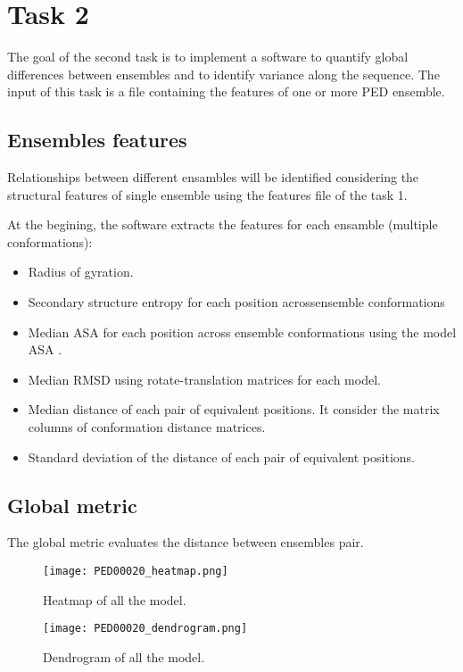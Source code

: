 \section{Task 2}\label{sec:task2}

The goal of the second task is to implement a software to quantify global differences between ensembles and to identify variance along the sequence. The input of this task is a file containing the features of one or more PED ensemble.

\subsection{Ensembles features}
Relationships between different ensambles will be identified considering the structural features of single ensemble using the features file of the task 1.

At the begining, the software extracts the features for each ensamble (multiple conformations):
\begin{itemize}
\item Radius of gyration.
\item Secondary structure entropy for each position acrossensemble conformations
\item Median ASA for each position across ensemble conformations using the model ASA .
\item Median RMSD using rotate-translation matrices for each model.
\item Median distance of each pair of equivalent positions. It consider the matrix columns of conformation distance matrices.
\item Standard deviation of the distance of each pair of equivalent positions.
\end{itemize}


\subsection{Global metric}
The global metric evaluates the distance between ensembles pair. 

\begin{figure}[H]
	\begin{minipage}[b]{0.9\textwidth}
		\centering
		\texttt{[image: PED00020\_heatmap.png]}
		\caption{Heatmap of all the model.}
		\label{heatmap}
	\end{minipage}
	\hfill
	\begin{minipage}[b]{0.9\textwidth}
		\centering
		\texttt{[image: PED00020\_dendrogram.png]}
		\caption{Dendrogram of all the model.}
		\label{dendrogram}
	\end{minipage}
\end{figure}


